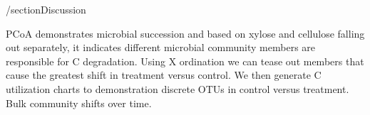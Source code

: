 /section{Discussion}

PCoA demonstrates microbial succession and based on xylose and cellulose falling out separately, it indicates different microbial community members are responsible for C degradation.  Using X ordination we can tease out members that cause the greatest shift in treatment versus control.  We then generate C utilization charts to demonstration discrete OTUs in control versus treatment.  Bulk community shifts over time. 